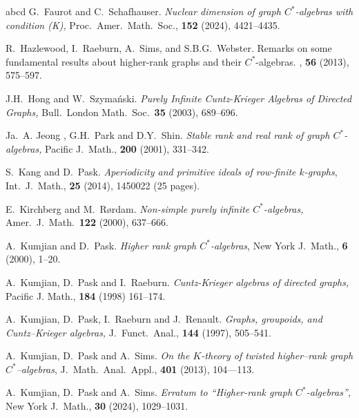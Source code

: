 \documentclass[12pt]{amsart}
\theoremstyle{plain}
\theoremstyle{definition}
\theoremstyle{remark}
\begin{document}
\begin{thebibliography}{abcd}
 G.\ Faurot and C.\ Schafhauser. \emph{Nuclear dimension of graph $C^*$-algebras with condition (K),} Proc.\ Amer.\ Math.\ Soc., \textbf{152} (2024), 4421--4435.

R.~Hazlewood, I.\ Raeburn, A.\ Sims, and S.B.G.\ Webster.
\newblock Remarks on some fundamental results about higher-rank graphs and their {$C^*$}-algebras.
, \textbf{56} (2013), 575--597.

 J.H.\ Hong and W.\ Szyma\'nski. \emph{Purely Infinite Cuntz-Krieger Algebras of Directed Graphs,} Bull.\ London Math.\ Soc.\ \textbf{35} (2003), 689--696.

 Ja.\ A. Jeong , G.H.\ Park and D.Y.\ Shin. \emph{Stable rank and real rank of graph $C^*$-algebras,} Pacific J.\ Math., \textbf{200} (2001), 331--342.

 S.\ Kang and D.\ Pask. \emph{Aperiodicity and primitive ideals of row-finite $k$-graphs}, Int.\ J.\ Math., \textbf{25} (2014), 1450022 (25 pages). %

 E.\ Kirchberg and M.\ R\o rdam. \emph{Non-simple purely infinite $C^*$-algebras,} Amer.\ J.\ Math.\ \textbf{122} (2000),  637--666.

 A.\ Kumjian and D.\ Pask. \emph{Higher rank graph $C^*$-algebras}, New York J.\ Math., {\bf 6} (2000), 1--20. %

 A.\ Kumjian, D.\ Pask and I.\ Raeburn. \emph{Cuntz-Krieger algebras of directed graphs,}
Pacific J. Math., \textbf{184} (1998) 161--174.

 A.\ Kumjian, D.\ Pask, I.\ Raeburn and J.\ Renault. \emph{Graphs, groupoids, and Cuntz--Krieger algebras,} J.\ Funct.\ Anal., \textbf{144} (1997), 505--541.

 A.\ Kumjian, D.\ Pask and A.\ Sims. \emph{On the $K$-theory of twisted higher--rank graph $C^*$--algebras}, J.\ Math.\ Anal.\  Appl., {\bf 401} (2013), 104---113.

 A.\ Kumjian, D.\ Pask and A.\ Sims. \emph{Erratum to ``Higher-rank graph $C^*$-algebras'',} New York J.\ Math., {\bf 30} (2024), 1029--1031.


\end{thebibliography}
\end{document}
